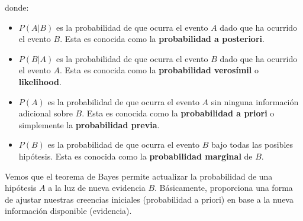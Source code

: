 \documentclass[
  letterpaper,
  DIV=11,
  numbers=noendperiod]{scrreprt}
\providecommand{\tightlist}{%
  \setlength{\itemsep}{0pt}\setlength{\parskip}{0pt}}\usepackage{longtable,booktabs,array}
\begin{document}
donde:

\begin{itemize}
\tightlist
\item
  \(P(A|B)\) es la probabilidad de que ocurra el evento \(A\) dado que
  ha ocurrido el evento \(B\). Esta es conocida como la
  \textbf{probabilidad a posteriori}.
\item
  \(P(B|A)\) es la probabilidad de que ocurra el evento \(B\) dado que
  ha ocurrido el evento \(A\). Esta es conocida como la
  \textbf{probabilidad verosímil} o \textbf{likelihood}.
\item
  \(P(A)\) es la probabilidad de que ocurra el evento \(A\) sin ninguna
  información adicional sobre \(B\). Esta es conocida como la
  \textbf{probabilidad a priori} o simplemente la \textbf{probabilidad
  previa}.
\item
  \(P(B)\) es la probabilidad de que ocurra el evento \(B\) bajo todas
  las posibles hipótesis. Esta es conocida como la \textbf{probabilidad
  marginal} de \(B\).
\end{itemize}

Vemos que el teorema de Bayes permite actualizar la probabilidad de una
hipótesis \(A\) a la luz de nueva evidencia \(B\). Básicamente,
proporciona una forma de ajustar nuestras creencias iniciales
(probabilidad a priori) en base a la nueva información disponible
(evidencia).
\end{document}
